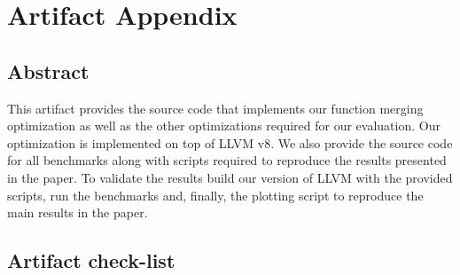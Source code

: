 \documentclass{sigplanconf}
\begin{document}


\appendix
\section{Artifact Appendix}

\subsection{Abstract}

This artifact provides the source code that implements our function merging
optimization as well as the other optimizations required for our evaluation.
Our optimization is implemented on top of LLVM v8.
We also provide the source code for all benchmarks along with scripts
required to reproduce the results presented in the paper. 
To validate the results build our version of LLVM with the provided scripts,
run the benchmarks and, finally, the plotting script to reproduce the main
results in the paper.

\subsection{Artifact check-list}

\end{document}
